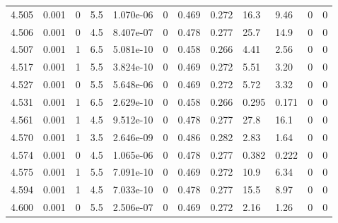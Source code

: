 \documentclass[preview]{standalone}
\begin{document}
{{{{{{{{\begin{tabular}{L{1.2cm}C{1.2cm} C{0.3cm}C{0.5cm} C{1.4cm}C{1.4cm} C{1.4cm}C{1.4cm} C{1.6cm}C{1.6cm} C{1.6cm}C{1.6cm}}
  4.505  &  0.001  & 0     & 5.5 &  1.070e-06  & 0  &  0.469&   0.272& 16.3 & 9.46   &  0 & 0  \\ 
  4.506  &  0.001  & 0     & 4.5 &  8.407e-07  & 0  &  0.478&   0.277& 25.7 & 14.9   &  0 & 0  \\ 
  4.507  &  0.001  & 1     & 6.5 &  5.081e-10  & 0  &  0.458&   0.266& 4.41 & 2.56   &  0 & 0  \\ 
  4.517  &  0.001  & 1     & 5.5 &  3.824e-10  & 0  &  0.469&   0.272& 5.51 & 3.20   &  0 & 0  \\ 
  4.527  &  0.001  & 0     & 5.5 &  5.648e-06  & 0  &  0.469&   0.272& 5.72 & 3.32   &  0 & 0  \\ 
  4.531  &  0.001  & 1     & 6.5 &  2.629e-10  & 0  &  0.458&   0.266& 0.295 & 0.171   &  0 & 0  \\ 
  4.561  &  0.001  & 1     & 4.5 &  9.512e-10  & 0  &  0.478&   0.277& 27.8 & 16.1   &  0 & 0  \\ 
  4.570  &  0.001  & 1     & 3.5 &  2.646e-09  & 0  &  0.486&   0.282& 2.83 & 1.64   &  0 & 0  \\ 
  4.574  &  0.001  & 0     & 4.5 &  1.065e-06  & 0  &  0.478&   0.277& 0.382 & 0.222   &  0 & 0  \\ 
  4.575  &  0.001  & 1     & 5.5 &  7.091e-10  & 0  &  0.469&   0.272& 10.9 & 6.34   &  0 & 0  \\ 
  4.594  &  0.001  & 1     & 4.5 &  7.033e-10  & 0  &  0.478&   0.277& 15.5 & 8.97   &  0 & 0  \\ 
  4.600  &  0.001  & 0     & 5.5 &  2.506e-07  & 0  &  0.469&   0.272& 2.16 & 1.26   &  0 & 0  \\ 
\hline 
\end{tabular} 

}}}}}}}}
\end{document}
